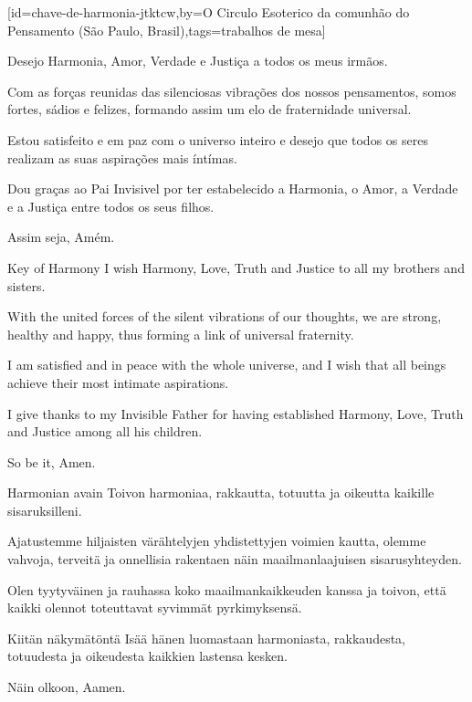 \sclearpage
{}[id={chave-de-harmonia-jtktcw},by={O Circulo Esoterico da comunhão do Pensamento (São Paulo, Brasil)},tags={trabalhos de mesa}]
  \begin{passage}[PT]{}
    Desejo Harmonia, Amor, Verdade e Justiça a todos os
    meus irmãos.
    \par
    Com as forças reunidas das silenciosas vibrações
    dos nossos pensamentos, somos fortes, sádios e
    felizes, formando assim um elo de fraternidade
    universal.
    \par
    Estou satisfeito e em paz com o universo inteiro
    e desejo que todos os seres realizam as suas
    aspirações mais íntímas.
    \par
    Dou graças ao Pai Invisivel por ter estabelecido
    a Harmonia, o Amor, a Verdade e a Justiça entre
    todos os seus filhos.
    \par
    Assim seja, Amém.
  \end{passage}
  \hardbrk
  \begin{passage}[EN]{Key of Harmony}
    I wish Harmony, Love, Truth and Justice to all my
    brothers and sisters.
    \par
    With the united forces of the silent vibrations
    of our thoughts, we are strong, healthy and happy,
    thus forming a link of universal fraternity.
    \par
    I am satisfied and in peace with the whole
    universe, and I wish that all beings achieve their
    most intimate aspirations.
    \par
    I give thanks to my Invisible Father for having
    established Harmony, Love, Truth and Justice among
    all his children.
    \par
    So be it, Amen.
  \end{passage}
  \begin{passage}[FI]{Harmonian avain}
    Toivon harmoniaa, rakkautta, totuutta ja oikeutta kaikille sisaruksilleni.
    \par
    Ajatustemme hiljaisten värähtelyjen yhdistettyjen voimien kautta, olemme
    vahvoja, terveitä ja onnellisia rakentaen näin maailmanlaajuisen
    sisarusyhteyden.
    \par
    Olen tyytyväinen ja rauhassa koko maailmankaikkeuden kanssa ja toivon,
    että kaikki olennot toteuttavat syvimmät pyrkimyksensä.
    \par
    Kiitän näkymätöntä Isää hänen luomastaan harmoniasta, rakkaudesta,
    totuudesta ja oikeudesta kaikkien lastensa kesken.
    \par
    Näin olkoon, Aamen.
  \end{passage}
\endsong



